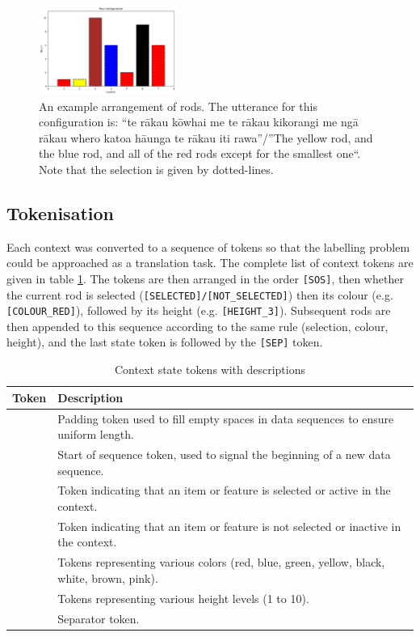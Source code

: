 \begin{figure}[htbp]
  \centering
  \includegraphics[width=0.4\textwidth]{images/rākau_plot.png} %
  \caption{An example arrangement of rods. The utterance for this configuration is: ``te rākau kōwhai me te rākau kikorangi me ngā rākau whero katoa hāunga te rākau iti rawa''/''The yellow rod, and the blue rod, and all of the red rods except for the smallest one``. Note that the selection is given by dotted-lines.}
  \label{fig:rākau_plot} %
\end{figure}

\subsection{Tokenisation}

Each context was converted to a sequence of tokens so that the labelling problem could be approached as a translation task. The complete list of context tokens are given in table \ref{tab:state_tokens}. The tokens are then arranged in the order \texttt{[SOS]}, then whether the current rod is selected (\texttt{[SELECTED]/[NOT\_SELECTED]}) then its colour (e.g. \texttt{[COLOUR\_RED]}), followed by its height (e.g. \texttt{[HEIGHT\_3]}). Subsequent rods are then appended to this sequence according to the same rule (selection, colour, height), and the last state token is followed by the \texttt{[SEP]} token.

\begin{table}[t]
\centering
\begin{tabular}{|>{\ttfamily}l|p{12cm}|}
\hline
\textbf{Token}         & \textbf{Description} \\ \hline
[PAD]                  & Padding token used to fill empty spaces in data sequences to ensure uniform length. \\ \hline
[SOS]                  & Start of sequence token, used to signal the beginning of a new data sequence. \\ \hline
[SELECTED]             & Token indicating that an item or feature is selected or active in the context. \\ \hline
[NOT\_SELECTED]        & Token indicating that an item or feature is not selected or inactive in the context. \\ \hline
[COLOURS]              & Tokens representing various colors (red, blue, green, yellow, black, white, brown, pink). \\ \hline
[HEIGHTS]              & Tokens representing various height levels (1 to 10). \\ \hline
[SEP]                  & Separator token. \\ \hline
\end{tabular}
\caption{Context state tokens with descriptions}
\label{tab:state_tokens}
\end{table}


